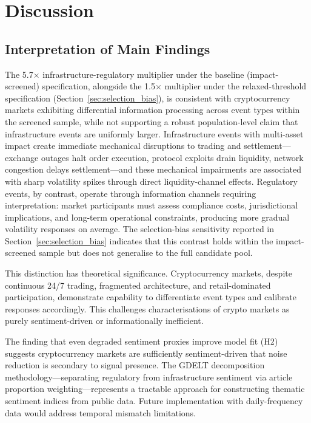\documentclass[pdflatex,sn-mathphys-num]{sn-jnl}
\theoremstyle{thmstyleone}
\theoremstyle{thmstyletwo}
\theoremstyle{thmstylethree}
\begin{document}
\section{Discussion}\label{sec:discussion}

\subsection{Interpretation of Main Findings}

The 5.7$\times$ infrastructure-regulatory multiplier under the baseline (impact-screened) specification, alongside the 1.5$\times$ multiplier under the relaxed-threshold specification (Section~\ref{sec:selection_bias}), is consistent with cryptocurrency markets exhibiting differential information processing across event types within the screened sample, while not supporting a robust population-level claim that infrastructure events are uniformly larger. Infrastructure events with multi-asset impact create immediate mechanical disruptions to trading and settlement---exchange outages halt order execution, protocol exploits drain liquidity, network congestion delays settlement---and these mechanical impairments are associated with sharp volatility spikes through direct liquidity-channel effects. Regulatory events, by contrast, operate through information channels requiring interpretation: market participants must assess compliance costs, jurisdictional implications, and long-term operational constraints, producing more gradual volatility responses on average. The selection-bias sensitivity reported in Section~\ref{sec:selection_bias} indicates that this contrast holds within the impact-screened sample but does not generalise to the full candidate pool.

This distinction has theoretical significance. Cryptocurrency markets, despite continuous 24/7 trading, fragmented architecture, and retail-dominated participation, demonstrate capability to differentiate event types and calibrate responses accordingly. This challenges characterisations of crypto markets as purely sentiment-driven or informationally inefficient.

The finding that even degraded sentiment proxies improve model fit (H2) suggests cryptocurrency markets are sufficiently sentiment-driven that noise reduction is secondary to signal presence. The GDELT decomposition methodology---separating regulatory from infrastructure sentiment via article proportion weighting---represents a tractable approach for constructing thematic sentiment indices from public data. Future implementation with daily-frequency data would address temporal mismatch limitations.
\end{document}

